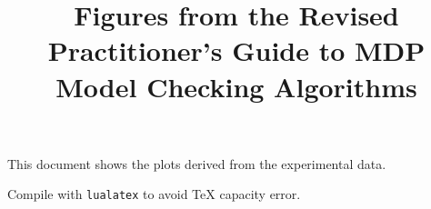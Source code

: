 \documentclass{article}
\begin{document}
\title{Figures from the Revised Practitioner's Guide to MDP Model Checking Algorithms}


\maketitle

\large
This document shows the plots derived from the experimental data.

\large
Compile with \texttt{lualatex} to avoid TeX capacity error.



\setcounter{figure}{3} %
\setlength{\quantileplotwidth}{0.6\textwidth}
\setlength{\quantileplotheight}{0.3\textwidth}
\setlength{\scatterplotsize}{0.3\textwidth}

\newcommand{\hwsubfig}[2]{\subfigure[#1]{\simplehardwarquantileplot{#2}\label{fig:hwquantile:#2}}}
\newcommand{\hwsubfigc}[1]{\hwsubfig{#1}{#1}}
\newcommand{\simplehardwarescatterplot}[4]{\hardwarescatterplot{plotdata/scatter-hardware.csv}{logs-#1}{#2}{logs-#3}{#4}{false}}
\newcommand{\hwscsubfig}[6]{\subfigure[#1]{\simplehardwarescatterplot{#2}{#3}{#4}{#5}\label{fig:#6:#2:#4}}}
\newcommand{\hwscsubfignc}[4]{\subfigure{\simplehardwarescatterplot{#1}{#2}{#3}{#4}}}
\newcommand{\hwscsubfigc}[2]{\hwscsubfig{#1 vs #2}{#1}{#1}{#2}{#2}{hwscatter}}
\newlength{\hwsubfigspace}


















{
	\setlength{\quantileplotwidth}{0.45\textwidth}

}





\end{document}
